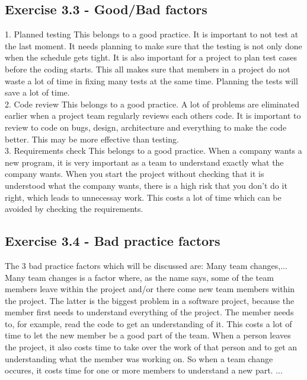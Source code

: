 \documentclass[10pt]{article}
\begin{document}
\subsection{Exercise 3.3 - Good/Bad factors}
1. Planned testing
This belongs to a good practice. It is important to not test at the last moment. It needs planning to make sure that the testing is not only done when the schedule gets tight. It is also important for a project to plan test cases before the coding starts. This all makes sure that members in a project do not waste a lot of time in fixing many tests at the same time. Planning the tests will save a lot of time.\\
2. Code review
This belongs to a good practice. A lot of problems are eliminated earlier when a project team regularly reviews each others code. It is important to review to code on bugs, design, architecture and everything to make the code better. This may be more effective than testing.\\
3. Requirements check
This belongs to a good practice. When a company wants a new program, it is very important as a team to understand exactly what the company wants. When you start the project without checking that it is understood what the company wants, there is a high risk that you don't do it right, which leads to unnecessay work. This costs a lot of time which can be avoided by checking the requirements.

\subsection{Exercise 3.4 - Bad practice factors}
The 3 bad practice factors which will be discussed are: Many team changes,...\\
Many team changes is a factor where, as the name says, some of the team members leave within the project and/or there come new team members within the project. The latter is the biggest problem in a software project, because the member first needs to understand everything of the project. The member needs to, for example, read the code to get an understanding of it. This costs a lot of time to let the new member be a good part of the team. When a person leaves the project, it also costs time to take over the work of that person and to get an understanding what the member was working on. So when a team change occures, it costs time for one or more members to understand a new part.
...
\end{document}
